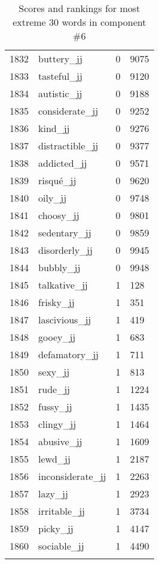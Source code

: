 \begin{longtable}[!htbp]{| rlr@{.}l |}
    1832 & buttery\_jj & 0 & 9075 \\
    1833 & tasteful\_jj & 0 & 9120 \\
    1834 & autistic\_jj & 0 & 9188 \\
    1835 & considerate\_jj & 0 & 9252 \\
    1836 & kind\_jj & 0 & 9276 \\
    1837 & distractible\_jj & 0 & 9377 \\
    1838 & addicted\_jj & 0 & 9571 \\
    1839 & risqué\_jj & 0 & 9620 \\
    1840 & oily\_jj & 0 & 9748 \\
    1841 & choosy\_jj & 0 & 9801 \\
    1842 & sedentary\_jj & 0 & 9859 \\
    1843 & disorderly\_jj & 0 & 9945 \\
    1844 & bubbly\_jj & 0 & 9948 \\
    1845 & talkative\_jj & 1 & 128 \\
    1846 & frisky\_jj & 1 & 351 \\
    1847 & lascivious\_jj & 1 & 419 \\
    1848 & gooey\_jj & 1 & 683 \\
    1849 & defamatory\_jj & 1 & 711 \\
    1850 & sexy\_jj & 1 & 813 \\
    1851 & rude\_jj & 1 & 1224 \\
    1852 & fussy\_jj & 1 & 1435 \\
    1853 & clingy\_jj & 1 & 1464 \\
    1854 & abusive\_jj & 1 & 1609 \\
    1855 & lewd\_jj & 1 & 2187 \\
    1856 & inconsiderate\_jj & 1 & 2263 \\
    1857 & lazy\_jj & 1 & 2923 \\
    1858 & irritable\_jj & 1 & 3734 \\
    1859 & picky\_jj & 1 & 4147 \\
    1860 & sociable\_jj & 1 & 4490 \\
    \hline
    \caption{Scores and rankings for most extreme 30 words in component \#6} \\
\end{longtable}
